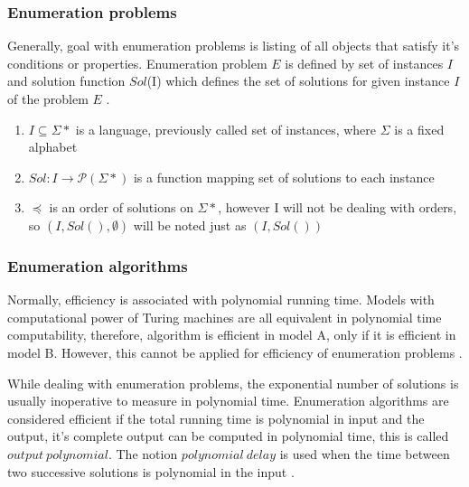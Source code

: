 \subsubsection{Enumeration problems}

Generally, goal with enumeration problems is listing of all objects that satisfy it's conditions or properties. Enumeration problem $E$ is defined by set of instances $I$ and solution function $Sol$(I) which defines the set of solutions for given instance $I$ of the problem $E$ \parencite{schmidt2009enumeration}.

\begin{definition}
  \begin{enumerate}
    Enumeration problem $E$ is a triple $(I,Sol(),\preceq)$
    \item $I \subseteq \Sigma\ast$ is a language, previously called set of instances, where $\Sigma$ is a fixed alphabet
    \item $Sol: I \rightarrow \mathscr{P}(\Sigma\ast)$ is a function mapping set of solutions to each instance
    \item $\preceq$ is an order of solutions on $\Sigma\ast$, however I will not be dealing with orders, so $(I,Sol(),\emptyset)$ will be noted just as $(I,Sol())$
  \end{enumerate}
\end{definition}

\subsubsection{Enumeration algorithms}

Normally, efficiency is associated with polynomial running time. Models with computational power of Turing machines are all equivalent in polynomial time computability, therefore, algorithm is efficient in model A, only if it is efficient in model B. However, this cannot be applied for efficiency of enumeration problems \parencite{schmidt2009enumeration}. 

While dealing with enumeration problems, the exponential number of solutions is usually inoperative to measure in polynomial time. Enumeration algorithms are considered efficient if the total running time is polynomial in input and the output, it's complete output can be computed in polynomial time, this is called $output\ polynomial$. The notion $polynomial\ delay$ is used when the time between two successive solutions is polynomial in the input \parencite{JOHNSON1988119}.

